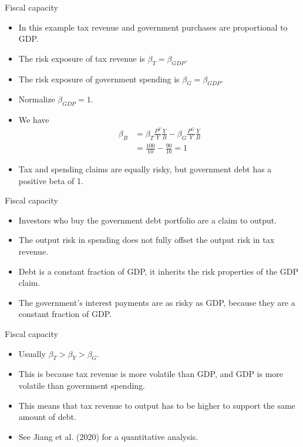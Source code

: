 \documentclass[11pt,xcolor={dvipsnames},aspectratio=159,hyperref={pdftex,pdfpagemode=UseNone,hidelinks,pdfdisplaydoctitle=true},usepdftitle=false]{beamer}
\begin{document}
\begin{frame}{Fiscal capacity}  
    \begin{itemize}
        \item In this example tax revenue and government purchases are proportional to GDP.
        \item The risk exposure of tax revenue is $\beta_T = \beta_{GDP}$.
        \item The risk exposure of government spending is $\beta_G = \beta_{GDP}$.
        \item Normalize $\beta_{GDP} = 1$.
        
        \item We have \begin{align*}
            \beta_B & =  \beta_T \frac{P^T}{Y}\frac{Y}{B} - \beta_G \frac{P^G}{Y}\frac{Y}{B} \\
            & = \frac{100}{10} - \frac{90}{10}  = 1
        \end{align*}
        \item  Tax and spending claims are equally risky, but government debt has a
        positive beta of 1.
    \end{itemize}
\end{frame}


\begin{frame}{Fiscal capacity}  
    \begin{itemize}
    \item Investors who buy the government
    debt portfolio are  a claim to output. 
    \item The output risk in spending does not fully offset the output risk in tax revenue.
    \item Debt is a constant fraction of GDP,
        it inherits the risk properties of the GDP claim.
    \item The government's interest payments are
        as risky as GDP, because they are a constant fraction of GDP.
    \end{itemize}
\end{frame}

\begin{frame}{Fiscal capacity}  
    \begin{itemize}
    \item Usually $\beta_T > \beta_Y > \beta_G$.
    \item This is because tax revenue is more volatile than GDP, and GDP is more volatile than government spending.
    \item This means that  tax revenue to output has to be higher to support the same amount of debt.
    \item See Jiang et al. (2020) for a quantitative analysis.
    \end{itemize}
\end{frame}
\end{document}
